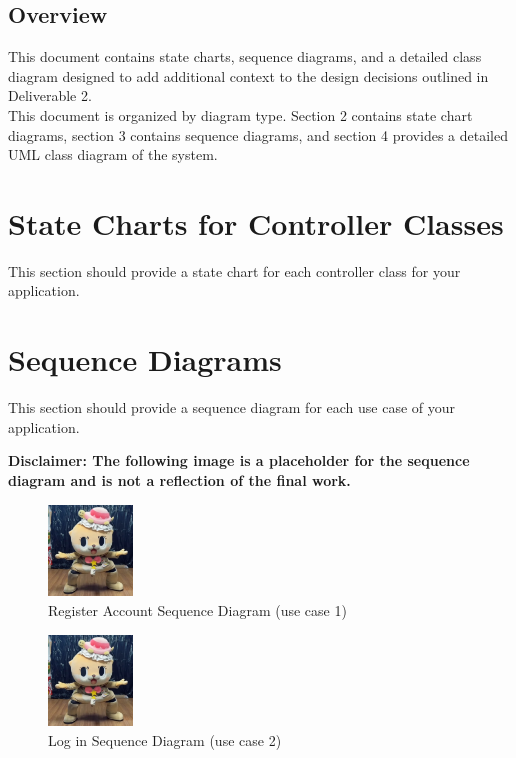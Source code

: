 \documentclass[]{article}
\begin{document}
\subsection{Overview}
\label{sub:overview}
This document contains state charts, sequence diagrams, and a detailed class diagram designed to add additional context
to the design decisions outlined in Deliverable 2.\medskip \\
This document is organized by diagram type. Section 2 contains state chart diagrams, section 3
contains sequence diagrams, and section 4 provides a detailed UML class diagram of the system.



\section{State Charts for Controller Classes}
\label{sec:state_charts_for_controller_classes}
This section should provide a state chart for each controller class for your application.

\section{Sequence Diagrams}
\label{sec:sequence_diagrams}
This section should provide a sequence diagram for each use case of your application.

\textbf{Disclaimer: The following image is a placeholder for the sequence diagram and is not a reflection of the final work.}


\begin{figure}[H]
    \centering
    \includegraphics[width=0.2\textwidth]{removelater.jpg} %
    \caption{Register Account Sequence Diagram (use case 1)}
\end{figure}

\begin{figure}[H]
    \centering
    \includegraphics[width=0.2\textwidth]{removelater.jpg} %
    \caption{Log in Sequence Diagram (use case 2)}
\end{figure}
\end{document}
